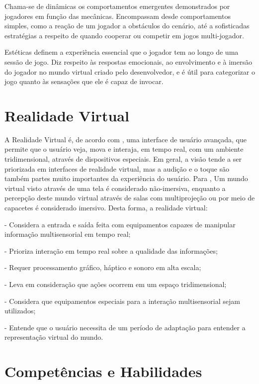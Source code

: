Chama-se de dinâmicas os comportamentos emergentes demonstrados por jogadores em função das mecânicas. Encompassam desde comportamentos simples, como a reação de um jogador a obstáculos do cenário, até a sofisticadas estratégias a respeito de quando cooperar ou competir em jogos multi-jogador.

Estéticas definem a experiência essencial que o jogador tem ao longo de uma sessão de jogo. Diz respeito às respostas emocionais, ao envolvimento e à imersão do jogador no mundo virtual criado pelo desenvolvedor, e é útil para categorizar o jogo quanto às sensações que ele é capaz de invocar.


\section{Realidade Virtual}\label{sec-realidadevirtual}

A Realidade Virtual é, de acordo com \cite{kirner:2007:RV_e_RA}, uma interface de usuário avançada, que permite que o usuário veja, mova e interaja, em tempo real, com um ambiente tridimensional, através de dispositivos especiais. Em geral, a visão tende a ser priorizada em interfaces de realidade virtual, mas a audição e o toque são também partes muito importantes da experiência do usuário.
Para \cite{kirner:2011:evolucao_RV}, Um mundo virtual visto através de uma tela é considerado não-imersiva, enquanto a percepção deste mundo virtual através de salas com multiprojeção ou por meio de capacetes é considerado imersivo. Desta forma, a realidade virtual:

- Considera a entrada e saída feita com equipamentos capazes de manipular informação multisensorial em tempo real;

- Prioriza interação em tempo real sobre a qualidade das informações;

- Requer processamento gráfico, háptico e sonoro em alta escala;

- Leva em consideração que ações ocorrem em um espaço tridimensional;

- Considera que equipamentos especiais para a interação multisensorial sejam utilizados;

- Entende que o usuário necessita de um período de adaptação para entender a representação virtual do mundo.

\section{Competências e Habilidades}\label{sec-competenciashabilidades}

